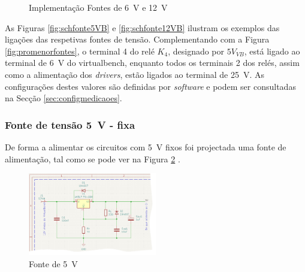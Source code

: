 \begin{figure}[hbtp]
	\centering%
		\centering
		\qquad
		\caption{Implementação Fontes de \SI{6}{\volt} e \SI{12}{\volt}}%
		\label{fig:fontes6-12}%
	\end{figure}

As Figuras \ref{fig:schfonte5VB} e \ref{fig:schfonte12VB} ilustram os exemplos das ligações das respetivas fontes de tensão. Complementando com a Figura \ref{fig:promenorfontes}, o terminal 4 do relé $K_{4}$, designado por $5V_{VB}$, está ligado ao terminal de \SI{6}{\volt} do \acrshort{virtualbench}, enquanto todos os terminais 2 dos relés, assim como a alimentação dos \textit{drivers}, estão ligados ao terminal de \SI{25}{\volt}. As configurações destes valores são definidas por \textit{software} e podem ser consultadas na Secção \ref{sec:configmedicaoes}.

\subsubsection{Fonte de tensão \SI{5}{\volt} - fixa}
De forma a alimentar os circuitos com \SI{5}{\volt} fixos foi projectada uma fonte de alimentação, tal como se pode ver na Figura \ref{fig:fonte5V} \cite{LM317}.

\begin{figure}[hbtp]
	\centering
	\includegraphics[width=0.5\textwidth]{figures/sch_fonte5V.png}
	\caption{Fonte de \SI{5}{\volt}}
	\label{fig:fonte5V}
\end{figure}

